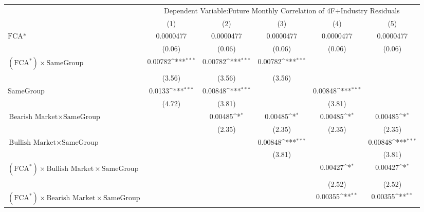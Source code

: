 {
\def\sym#1{\ifmmode^{#1}\else\(^{#1}\)\fi}
\begin{tabular}{l*{5}{c}}
\hline\hline
                &\multicolumn{5}{c}{Dependent Variable:Future Monthly Correlation of 4F+Industry Residuals}    \\\cmidrule(lr){2-6}
                &\multicolumn{1}{c}{(1)}         &\multicolumn{1}{c}{(2)}         &\multicolumn{1}{c}{(3)}         &\multicolumn{1}{c}{(4)}         &\multicolumn{1}{c}{(5)}         \\
\hline
$ \text{FCA*} $ &0.0000477         &0.0000477         &0.0000477         &0.0000477         &0.0000477         \\
                &   (0.06)         &   (0.06)         &   (0.06)         &   (0.06)         &   (0.06)         \\
[1em]
 $ (\text{FCA}^*) \times {\text{SameGroup} }  $ &  0.00782\sym{***}&  0.00782\sym{***}&  0.00782\sym{***}&                  &                  \\
                &   (3.56)         &   (3.56)         &   (3.56)         &                  &                  \\
[1em]
SameGroup       &   0.0133\sym{***}&  0.00848\sym{***}&                  &  0.00848\sym{***}&                  \\
                &   (4.72)         &   (3.81)         &                  &   (3.81)         &                  \\
[1em]
$ {\text{Bearish Market} } \times {\text{SameGroup} }  $ &                  &  0.00485\sym{*}  &  0.00485\sym{*}  &  0.00485\sym{*}  &  0.00485\sym{*}  \\
                &                  &   (2.35)         &   (2.35)         &   (2.35)         &   (2.35)         \\
[1em]
$ {\text{Bullish Market} } \times {\text{SameGroup} }  $ &                  &                  &  0.00848\sym{***}&                  &  0.00848\sym{***}\\
                &                  &                  &   (3.81)         &                  &   (3.81)         \\
[1em]
$ (\text{FCA}^*) \times {\text{Bullish Market}} \times {\text{SameGroup} }  $ &                  &                  &                  &  0.00427\sym{*}  &  0.00427\sym{*}  \\
                &                  &                  &                  &   (2.52)         &   (2.52)         \\
[1em]
$ (\text{FCA}^*) \times {\text{Bearish Market}} \times {\text{SameGroup} }  $ &                  &                  &                  &  0.00355\sym{**} &  0.00355\sym{**} \\

\end{tabular}}
